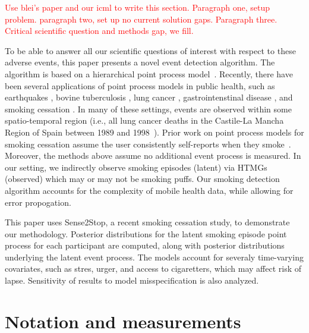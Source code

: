 \documentclass[11pt]{amsart}
\begin{document}
\textcolor{red}{Use blei's paper and our icml to write this
  section. Paragraph one, setup problem. paragraph two, set up no
  current solution gaps. Paragraph three. Critical scientific question
  and methods gap, we fill.}

To be able to answer all our scientific questions of interest with
respect to these adverse events, this paper presents a novel event
detection algorithm. The algorithm is based on a hierarchical point
process model~\cite{Blei, DempseyICML}.  Recently, there have been
several applications of point process models in public health, such as
earthquakes \cite{RevMCMCguys}, bovine tuberculosis
\cite{DiggleStatSci}, lung cancer \cite{DiggleStatSci}, 
gastrointenstinal disease \cite{DiggleStatSci}, and smoking cessation
\cite{MLHealth paper}.
In many of these settings, events are observed within some
spatio-temporal region (i.e., all lung cancer deaths in the Castile-La
Mancha Region of Spain between 1989 and 1998~\cite{DiggleStatSci}).
Prior work on point process models for smoking cessation assume the
user consistently self-reports when they smoke~\cite{MLHealth}.
Moreover, the methods above assume no additional event process is
measured. 
In our setting, we indirectly observe smoking episodes (latent) via
HTMGs (observed) which may or may not be smoking puffs.
Our smoking detection algorithm accounts for the complexity of mobile
health data, while allowing for error propogation.  
 
This paper uses Sense2Stop, a recent smoking cessation study, to
demonstrate our methodology.  Posterior distributions for the latent
smoking episode point process for each participant are computed, along
with posterior distributions underlying the latent event process.
The models account for severaly time-varying covariates, such as
stres, urger, and access to cigaretters, which may affect risk of
lapse. Sensitivity of results to model misspecification is also
analyzed.

\section{Notation and measurements}
\end{document}
